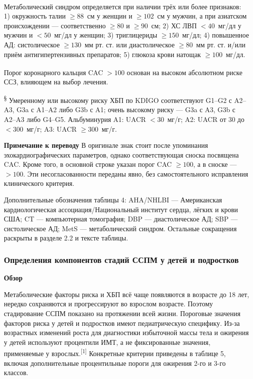\documentclass[11pt,a4paper]{article}
\newcommand{\src}[1]{\textsuperscript{[#1]}}
\newcommand{\editorial}[1]{\par\begingroup\small\color{black!70}\textbf{Примечание к переводу} #1\par\endgroup}
\newcommand{\heading}[1]{\par\medskip\textbf{#1}\par}
\begin{document}
\textsuperscript{\dag} Метаболический синдром определяется при наличии трёх или более признаков: 1) окружность талии $\geq88$~см у женщин и $\geq102$~см у мужчин, а при азиатском происхождении --- соответственно $\geq80$ и $\geq90$~см; 2) ХС ЛВП $<40$~мг/дл у мужчин и $<50$~мг/дл у женщин; 3) триглицериды $\geq150$~мг/дл; 4) повышенное АД: систолическое $\geq130$~мм рт. ст. или диастолическое $\geq80$~мм рт. ст. и/или приём антигипертензивных препаратов; 5) глюкоза крови натощак $\geq100$~мг/дл.

\textsuperscript{\ddag} Порог коронарного кальция CAC $>100$ основан на высоком абсолютном риске ССЗ, влияющем на выбор лечения.

\textsuperscript{§} Умеренному или высокому риску ХБП по KDIGO соответствуют G1--G2 с A2--A3, G3a с A1--A2 либо G3b с A1; очень высокому риску --- G3a с A3, G3b с A2--A3 либо G4--G5. Альбуминурия A1: UACR $<30$~мг/г; A2: UACR от 30 до $<300$~мг/г; A3: UACR $\geq300$~мг/г.

\editorial{В оригинале знак \ddag{} стоит после упоминания эхокардиографических параметров, однако соответствующая сноска посвящена CAC. Кроме того, в основной строке указан порог CAC $\geq100$, а в сноске --- $>100$. Эти несогласованности переданы явно, без самостоятельного исправления клинического критерия.}

{\small Дополнительные обозначения таблицы 4: AHA/NHLBI --- Американская кардиологическая ассоциация/Национальный институт сердца, лёгких и крови США; CT --- компьютерная томография; DBP --- диастолическое АД; SBP --- систолическое АД; MetS --- метаболический синдром. Остальные сокращения раскрыты в разделе 2.2 и тексте таблицы.}

\subsubsection{Определения компонентов стадий ССПМ у детей и подростков}
\heading{Обзор}
Метаболические факторы риска и ХБП всё чаще появляются в возрасте до 18 лет, нередко сохраняются и прогрессируют во взрослом возрасте. Поэтому стадирование ССПМ показано на протяжении всей жизни. Пороговые значения факторов риска у детей и подростков имеют педиатрическую специфику. Из-за возрастных изменений роста для диагностики избыточной массы тела и ожирения у детей используют процентили ИМТ, а не фиксированные значения, применяемые у взрослых.\src{1} Конкретные критерии приведены в таблице 5, включая дополнительные процентильные пороги для ожирения 2-го и 3-го классов.
\end{document}

